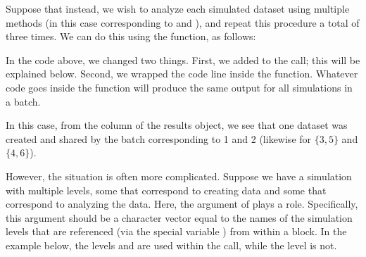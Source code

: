 Suppose that instead, we wish to analyze each simulated dataset using multiple methods (in this case corresponding to  and ), and repeat this procedure a total of three times. We can do this using the  function, as follows:


In the code above, we changed two things. First, we added  to the  call; this will be explained below. Second, we wrapped the code line  inside the  function. Whatever code goes inside the  function will produce the same output for all simulations in a batch.


In this case, from the  column of the results object, we see that one dataset was created and shared by the batch corresponding to  1 and 2 (likewise for  $\{3,5\}$ and $\{4,6\}$).

However, the situation is often more complicated. Suppose we have a simulation with multiple levels, some that correspond to creating data and some that correspond to analyzing the data. Here, the  argument of  plays a role. Specifically, this argument should be a character vector equal to the names of the simulation levels that are referenced (via the special variable ) from within a  block. In the example below, the levels  and  are used within the  call, while the level  is not.

